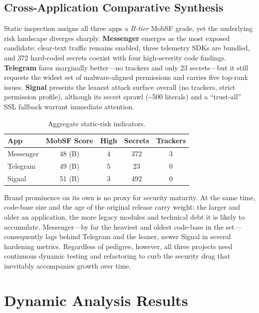 \documentclass[a4paper,12pt]{report}
\begin{document}
\subsection{Cross-Application Comparative Synthesis}
\label{sec:comparative-synthesis}

Static inspection assigns all three apps a \emph{B-tier} MobSF grade, yet the
underlying risk landscape diverges sharply.  \textbf{Messenger} emerges as the
most exposed candidate: clear-text traffic remains enabled, three telemetry
SDKs are bundled, and {\small 372} hard-coded secrets coexist with four
high-severity code findings.  \textbf{Telegram} fares marginally better—no
trackers and only 23 secrets—but it still requests the widest set of
malware-aligned permissions and carries five top-rank issues.  \textbf{Signal}
presents the leanest attack surface overall (no trackers, strict permission
profile), although its secret sprawl (\textasciitilde500 literals) and a
``trust-all'' SSL fallback warrant immediate attention.

\begin{table}[htbp]
  \centering
  \caption{Aggregate static-risk indicators.}
  \label{tab:risk-matrix}
  \begin{tabular}{|l|c|c|c|c|}
    \hline
    \textbf{App} & \textbf{MobSF Score} & \textbf{High} & \textbf{Secrets} & \textbf{Trackers} \\ \hline
    Messenger   & 48 (B) & 4 & 372 & 3 \\ \hline
    Telegram    & 49 (B) & 5 &  23 & 0 \\ \hline
    Signal      & 51 (B) & 3 & 492 & 0 \\ \hline
  \end{tabular}
\end{table}

Brand prominence on its own is no proxy for security maturity. At the same
time, code-base size and the age of the original release carry
weight: the larger and older an application, the more legacy modules and
technical debt it is likely to accumulate. Messenger—by far the heaviest and
oldest code-base in the set—consequently lags behind Telegram and the leaner,
newer Signal in several hardening metrics. Regardless of pedigree, however,
all three projects need continuous dynamic testing and refactoring to curb the
security drag that inevitably accompanies growth over time.

\section{Dynamic Analysis Results}
\end{document}
